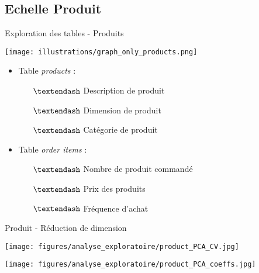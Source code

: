 \documentclass[10pt]{beamer}
\begin{document}
\subsection{Echelle Produit}
\begin{frame}{Exploration des tables - Produits }
\begin{minipage}{0.3\linewidth}
        \begin{center}
           \texttt{[image: illustrations/graph\_only\_products.png]}
        \end{center}
\end{minipage}
\begin{minipage}{0.68\linewidth}
\begin{itemize}
    \item Table \textit{products} :
    \begin{itemize}
        \item[$\textendash$] Description de produit
        \item[$\textendash$] Dimension de produit
        \item[$\textendash$] Catégorie de produit
    \end{itemize}
    \item Table \textit{order items} : 
    \begin{itemize}
        \item[$\textendash$] Nombre de produit commandé
        \item[$\textendash$] Prix des produits
        \item[$\textendash$] Fréquence d'achat
    \end{itemize}
\end{itemize}
\end{minipage}
\end{frame}
\begin{frame}{Produit - Réduction de dimension }
\begin{overprint}
\begin{center}
   \texttt{[image: figures/analyse\_exploratoire/product\_PCA\_CV.jpg]}
\end{center}
\vfill
\vspace{2cm}
\begin{center}
   \texttt{[image: figures/analyse\_exploratoire/product\_PCA\_coeffs.jpg]}
\end{center}
\vfill
\end{overprint}
\end{frame}
\end{document}
